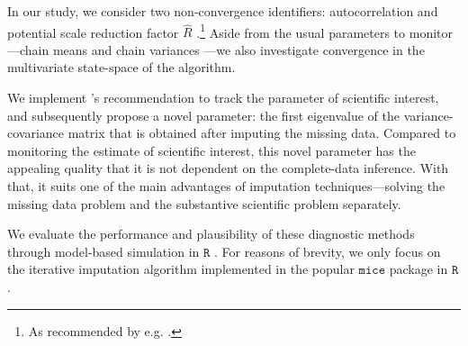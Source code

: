 \documentclass{article}
\begin{document}
In our study, we consider two non-convergence identifiers: autocorrelation \citep[conform][p.~147]{lync07} and potential scale reduction factor $\widehat{R}$ \citep[conform][p.~5]{veht19}.\footnote{As recommended by e.g. \citet{cowl96}.} Aside from the usual parameters to monitor---chain means and chain variances \citep[\(\S\) 4.5.6]{buur18}---we also investigate convergence in the multivariate state-space of the algorithm. 

We implement \citet[\(\S\) 6.5.1]{buur18}'s recommendation to track the parameter of scientific interest, and subsequently propose a novel parameter: the first eigenvalue of the variance-covariance matrix that is obtained after imputing the missing data. Compared to monitoring the estimate of scientific interest, this novel parameter has the appealing quality that it is not dependent on the complete-data inference. With that, it suits one of the main advantages of imputation techniques---solving the missing data problem and the substantive scientific problem separately.



% 
% 

We evaluate the performance and plausibility of these diagnostic methods through model-based simulation in $\mathtt{R}$ \citep{R}. For reasons of brevity, we only focus on the iterative imputation algorithm implemented in the popular $\mathtt{mice}$ package in $\mathtt{R}$ \citep{mice}. 
\end{document}
